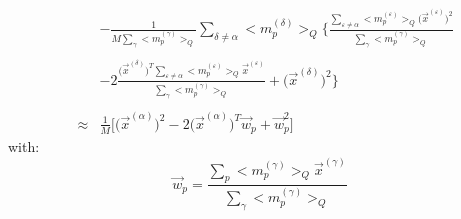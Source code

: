 \begin{equation}
\begin{array}{lll}
	&& - \frac{1}{M \sum\limits_\gamma \big< m_p^{(\gamma)} \big>_Q}
		\sum\limits_{\delta \neq \alpha} \big< m_p^{(\delta)}
		\big>_Q \Bigg\{ \frac{\sum\limits_{\varepsilon \neq \alpha} 
		\big< m_p^{(\varepsilon)} \big>_Q 
		\big(\vec{x}^{(\varepsilon)} \big)^2 }{
			\sum\limits_\gamma \big< m_p^{(\gamma)} \big>_Q} \\\\
	&& -2 \frac{\big(\vec{x}^{(\delta)} \big)^T 
			\sum\limits_{\varepsilon \neq \alpha} 
			\big< m_p^{(\varepsilon)} \big>_Q 
			\vec{x}^{(\varepsilon)}}{
				\sum\limits_\gamma \big< m_p^{(\gamma)}
				\big>_Q} + \big( \vec{x}^{(\delta)} \big)^2
		\Bigg\} \\\\
	& \approx & \frac{1}{M} \bigg[ \big( \vec{x}^{(\alpha)} \big)^2 
		-2 \big( \vec{x}^{(\alpha)} \big)^T \vec{w}_p + \vec{w}_p^2
		\bigg]
	\end{array}
\end{equation}
with:
\begin{equation}
	\vec{w}_p = \frac{\sum\limits_p \big< m_p^{(\gamma)} \big>_Q
			\vec{x}^{(\gamma)} }{ \sum\limits_\gamma
				\big< m_p^{(\gamma)} \big>_Q}
\end{equation}
